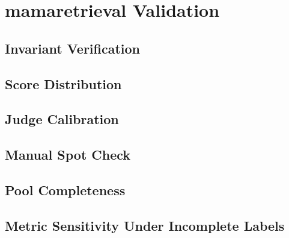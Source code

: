 \section{mamaretrieval Validation}

\subsection{Invariant Verification}

\subsection{Score Distribution}

\subsection{Judge Calibration}

\subsection{Manual Spot Check}

\subsection{Pool Completeness}

\subsection{Metric Sensitivity Under Incomplete Labels}

